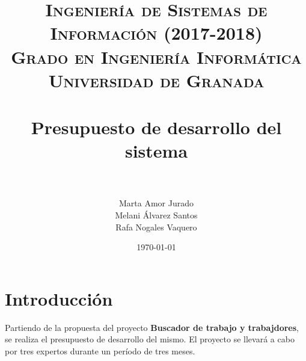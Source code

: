 


\title{	
\normalfont \normalsize 
\textsc{\textbf{Ingeniería de Sistemas de Información (2017-2018)} \\ Grado en Ingeniería Informática \\ Universidad de Granada} \\ [25pt] %
\horrule{0.5pt} \\[0.4cm] %
\huge Presupuesto de desarrollo del sistema \\ %
\horrule{2pt} \\[0.5cm]
}

\author{Marta Amor Jurado \\ Melani Álvarez Santos \\ Rafa Nogales Vaquero} %

\date{\normalsize\today} %



\maketitle
\newpage 
\tableofcontents
\newpage
\setlength{\parindent}{1cm}


\section{Introducción}
Partiendo de la propuesta del proyecto \textbf{Buscador de trabajo y trabajdores}, se realiza el presupuesto de desarrollo del mismo. El proyecto se llevará a cabo por tres expertos durante un período de tres meses.



